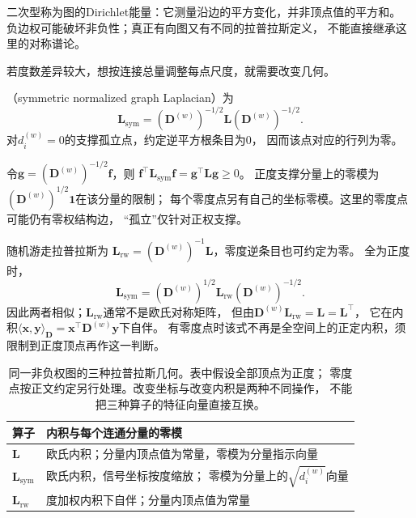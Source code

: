 二次型称为图的Dirichlet能量：它测量沿边的平方变化，并非顶点值的平方和。
负边权可能破坏非负性；真正有向图又有不同的拉普拉斯定义，
不能直接继承这里的对称谱论。

若度数差异较大，想按连接总量调整每点尺度，就需要改变几何。
\begin{definition}[对称归一化拉普拉斯]
  \label{def:graph-theory-normalized-laplacian}
  （symmetric normalized graph Laplacian）为
  \begin{equation}
    \bm L_{\mathrm{sym}}
    =(\bm D^{(w)})^{-1/2}\bm L(\bm D^{(w)})^{-1/2}.
    \label{eq:graph-theory-normalized-laplacian}
  \end{equation}
  对\(d_i^{(w)}=0\)的支撑孤立点，约定逆平方根条目为\(0\)，
  因而该点对应的行列为零。
\end{definition}

令\(\bm g=(\bm D^{(w)})^{-1/2}\bm f\)，则
\(\bm f^\top\bm L_{\mathrm{sym}}\bm f=\bm g^\top\bm L\bm g\geq0\)。
正度支撑分量上的零模为\((\bm D^{(w)})^{1/2}\bm1\)在该分量的限制；
每个零度点另有自己的坐标零模。这里的零度点可能仍有零权结构边，
“孤立”仅针对正权支撑。

随机游走拉普拉斯为
\(\bm L_{\mathrm{rw}}=(\bm D^{(w)})^{-1}\bm L\)，零度逆条目也可约定为零。
全为正度时，
\[
  \bm L_{\mathrm{sym}}
  =(\bm D^{(w)})^{1/2}\bm L_{\mathrm{rw}}(\bm D^{(w)})^{-1/2}.
\]
因此两者相似；\(\bm L_{\mathrm{rw}}\)通常不是欧氏对称矩阵，
但由\(\bm D^{(w)}\bm L_{\mathrm{rw}}=\bm L=\bm L^\top\)，
它在内积\(\langle\bm x,\bm y\rangle_{\bm D}
=\bm x^\top\bm D^{(w)}\bm y\)下自伴。
有零度点时该式不再是全空间上的正定内积，须限制到正度顶点再作这一判断。

\begin{table}[htbp]
  \centering\small
  \begin{tabularx}{\linewidth}{@{}lX@{}}
    \toprule
    算子 & 内积与每个连通分量的零模\\
    \midrule
    \(\bm L\) & 欧氏内积；分量内顶点值为常量，零模为分量指示向量\\
    \(\bm L_{\mathrm{sym}}\) & 欧氏内积，信号坐标按度缩放；
      零模为分量上的\(\sqrt{d_i^{(w)}}\)向量\\
    \(\bm L_{\mathrm{rw}}\) & 度加权内积下自伴；分量内顶点值为常量\\
    \bottomrule
  \end{tabularx}
  \caption{同一非负权图的三种拉普拉斯几何。表中假设全部顶点为正度；
  零度点按正文约定另行处理。改变坐标与改变内积是两种不同操作，
  不能把三种算子的特征向量直接互换。}
  \label{tab:graph-theory-laplacian-geometries}
\end{table}

